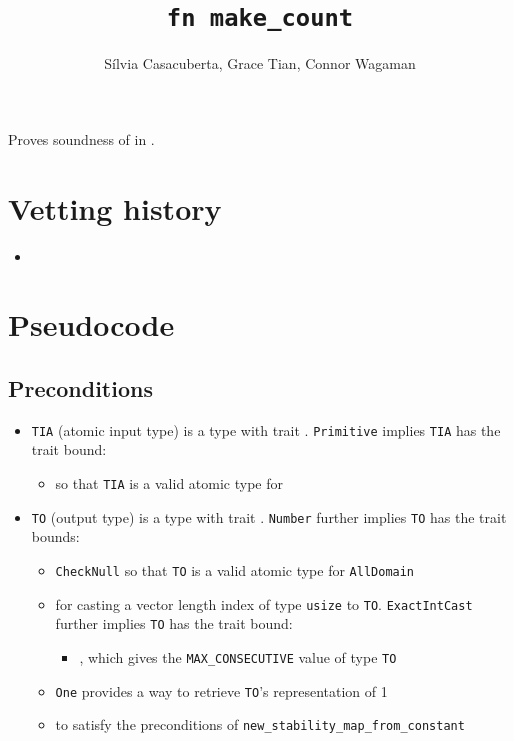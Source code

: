 \documentclass{article}
\title{\texttt{fn make\_count}}
\author{S\'ilvia Casacuberta, Grace Tian, Connor Wagaman}
\date{}
\begin{document}
\maketitle

\contrib
Proves soundness of  in .

\section{Vetting history}
\begin{itemize}
    \item {}
\end{itemize}

\section{Pseudocode}

\label{sec:pseudocode}

\subsection*{Preconditions}
\begin{itemize}

    \item \texttt{TIA} (atomic input type) is a type with trait . \texttt{Primitive} implies \texttt{TIA} has the trait bound:
    \begin{itemize}
        \item {} so that \texttt{TIA} is a valid atomic type for 
    \end{itemize}

    \item \texttt{TO} (output type) is a type with trait . \texttt{Number} further implies \texttt{TO} has the trait bounds:
    \begin{itemize}
        \item \texttt{CheckNull} so that \texttt{TO} is a valid atomic type for \texttt{AllDomain}
        \item {} for casting a vector length index of type \texttt{usize} to \texttt{TO}. \texttt{ExactIntCast} further implies \texttt{TO} has the trait bound:
        \begin{itemize}
            \item {}, which gives the \texttt{MAX\_CONSECUTIVE} value of type \texttt{TO}
        \end{itemize}
        
        \item \texttt{One} provides a way to retrieve \texttt{TO}'s representation of 1
        \item {} to satisfy the preconditions of \texttt{new\_stability\_map\_from\_constant}
    \end{itemize}
\end{itemize}
\end{document}
